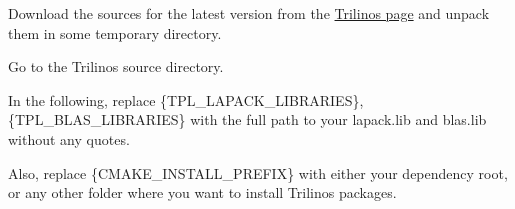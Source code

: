 \documentclass[a4paper,0pt,english]{sphinxmanual}
\begin{document}
\begin{DUlineblock}{0em}
\item[] Download the sources for the latest version from the \href{http://trilinos.sandia.gov}{Trilinos page} and unpack them in some temporary directory.
\item[] 
\item[] Go to the Trilinos source directory.
\item[] 
\item[] In the following, replace \{TPL\_LAPACK\_LIBRARIES\}, \{TPL\_BLAS\_LIBRARIES\} with the full path to your lapack.lib and blas.lib without any quotes.
\item[] Also, replace \{CMAKE\_INSTALL\_PREFIX\} with either your dependency root, or any other folder where you want to install Trilinos packages.
\end{DUlineblock}
\end{document}

